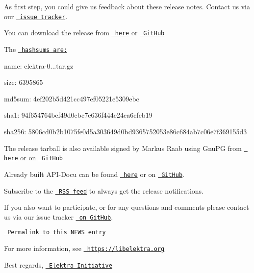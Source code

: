 As first step, you could give us feedback about these release notes. Contact us via our \href{https://issues.libelektra.org}{\texttt{ issue tracker}}.

You can download the release from \href{https://www.libelektra.org/ftp/elektra/releases/elektra-0.8.26.tar.gz}{\texttt{ here}} or \href{https://github.com/ElektraInitiative/ftp/blob/master/releases/elektra-0.8.26.tar.gz?raw=true}{\texttt{ Git\+Hub}}

The \href{https://github.com/ElektraInitiative/ftp/blob/master/releases/elektra-0.8.26.tar.gz.hashsum?raw=true}{\texttt{ hashsums are\+:}}


\begin{DoxyItemize}
\item name\+: elektra-\/0...\+tar.\+gz
\item size\+: 6395865
\item md5sum\+: 4ef202b5d421cc497ef05221e5309ebc
\item sha1\+: 94f654764bcf49d0ebc7e636f444e24ca6cfeb19
\item sha256\+: 5806cd0b2b1075fe0d5a303649d0bd9365752053e86c684ab7c06e7f369155d3
\end{DoxyItemize}

The release tarball is also available signed by Markus Raab using Gnu\+PG from \href{https://www.libelektra.org/ftp/elektra/releases/elektra-0.8.26.tar.gz.gpg}{\texttt{ here}} or on \href{https://github.com/ElektraInitiative/ftp/blob/master/releases//elektra-0.8.26.tar.gz.gpg?raw=true}{\texttt{ Git\+Hub}}

Already built A\+P\+I-\/\+Docu can be found \href{https://doc.libelektra.org/api/0.8.26/html/}{\texttt{ here}} or on \href{https://github.com/ElektraInitiative/doc/tree/master/api/0.8.26}{\texttt{ Git\+Hub}}.

Subscribe to the \href{https://www.libelektra.org/news/feed.rss}{\texttt{ R\+SS feed}} to always get the release notifications.

If you also want to participate, or for any questions and comments please contact us via our issue tracker \href{http://issues.libelektra.org}{\texttt{ on Git\+Hub}}.

\href{https://www.libelektra.org/news/0.8.26-release}{\texttt{ Permalink to this N\+E\+WS entry}}

For more information, see \href{https://libelektra.org}{\texttt{ https\+://libelektra.\+org}}

Best regards, \href{https://www.libelektra.org/developers/authors}{\texttt{ Elektra Initiative}} 